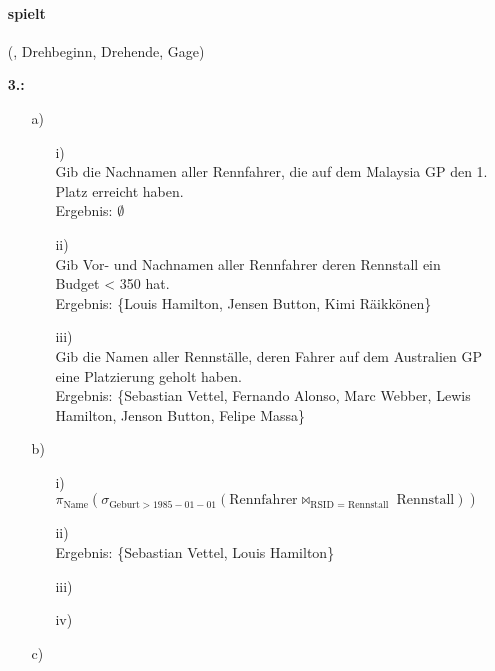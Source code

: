 \documentclass[a4paper,11pt,fleqn]{scrartcl}
\begin{document}
\begin{enumerate}
		    \paragraph{spielt}(, Drehbeginn, 
		    Drehende, Gage)\\
		\item[\textbf{3.:}]
		\begin{enumerate}
			\item[a)]\quad \\
			\begin{enumerate}
				\item[i)]\quad \\
					Gib die Nachnamen aller Rennfahrer, die auf dem Malaysia GP den 1. Platz erreicht haben.\\
                  	Ergebnis: $\emptyset$
				\item[ii)]\quad \\
					Gib Vor- und Nachnamen aller Rennfahrer deren Rennstall ein Budget < 350 hat.\\
	                Ergebnis: \{Louis Hamilton, Jensen Button, Kimi Räikkönen\}
				\item[iii)]\quad \\
					Gib die Namen aller Rennställe, deren Fahrer auf dem Australien GP eine Platzierung geholt haben.\\
                    Ergebnis: \{Sebastian Vettel, Fernando Alonso, Marc Webber, Lewis Hamilton, Jenson Button, Felipe Massa\}
			\end{enumerate}
			\item[b)]\quad \\
			\begin{enumerate}
				\item[i)]\quad \\
					$\pi_{\text{Name}}(\sigma_{\text{Geburt} > 1985-01-01}(\text{Rennfahrer} \bowtie_{\text{RSID = Rennstall 
					}}\text{Rennstall}))$\\
				\item[ii)]\quad \\
					Ergebnis: \{Sebastian Vettel, Louis Hamilton\}
				\item[iii)]\quad \\
				\todo
				\item[iv)]\quad \\
				\todo
			\end{enumerate}
			\item[c)]\quad \\

\end{enumerate}
\end{enumerate}
\end{document}

